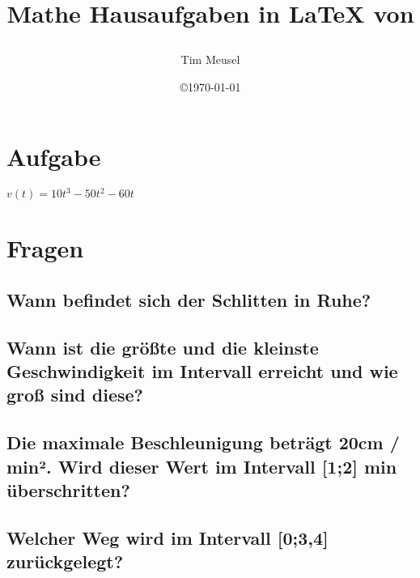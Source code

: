 \documentclass[a4paper,11pt]{scrartcl}
\author{Tim Meusel}
\title{Mathe Hausaufgaben in \LaTeX{} von \author{}}
\date{\copyright\today}
\begin{document}
\maketitle

\section{Aufgabe}

$v(t) = 10t^3 - 50t^2 - 60t$

\section{Fragen}

\subsection{Wann befindet sich der Schlitten in Ruhe?}

\subsection{Wann ist die größte und die kleinste Geschwindigkeit im Intervall erreicht und wie groß sind diese?}

\subsection{Die maximale Beschleunigung beträgt 20cm / min². Wird dieser Wert im Intervall [1;2] min überschritten?
}
\subsection{Welcher Weg wird im Intervall [0;3,4] zurückgelegt?}
\end{document}
